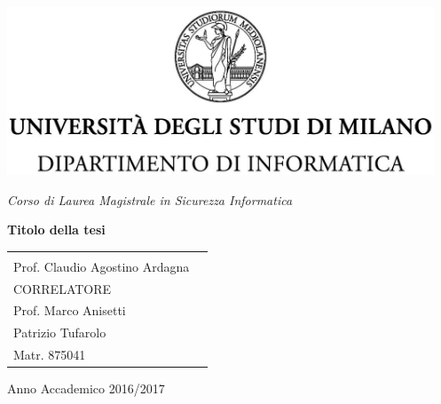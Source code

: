 \begin{titlepage}
  \begin{center}
    \includegraphics[height=5.0cm]{immagini/unimi.jpg}
    
    \vspace*{.4cm}
    {\Large 
      \emph{Corso di Laurea Magistrale in Sicurezza Informatica}
    }
    \vfill
    \begin{LARGE}
      \textbf{Titolo della tesi}
    \end{LARGE}
    
    \vfill
    \begin{minipage}{\linewidth}
      \begin{tabular}{l r}
        \begin{minipage}{.45\linewidth}
          \begin{flushleft}
            {\large
              RELATORE\\[.2cm]
              Prof. Claudio Agostino Ardagna \\[.6cm]
              CORRELATORE\\[.2cm]
              Prof. Marco Anisetti
            }

          \end{flushleft}
        \end{minipage}
        &
        \begin{minipage}{.45\linewidth}
          \begin{flushright}
            {\large
              TESI DI LAUREA DI\\[.3cm]
              Patrizio Tufarolo\\[.45cm]
              Matr. 875041
            }
          \end{flushright}
        \end{minipage}
      \end{tabular}
    \end{minipage}
    
    \vfill
    {\large{{Anno Accademico 2016/2017}}}
  \end{center}
\end{titlepage}


